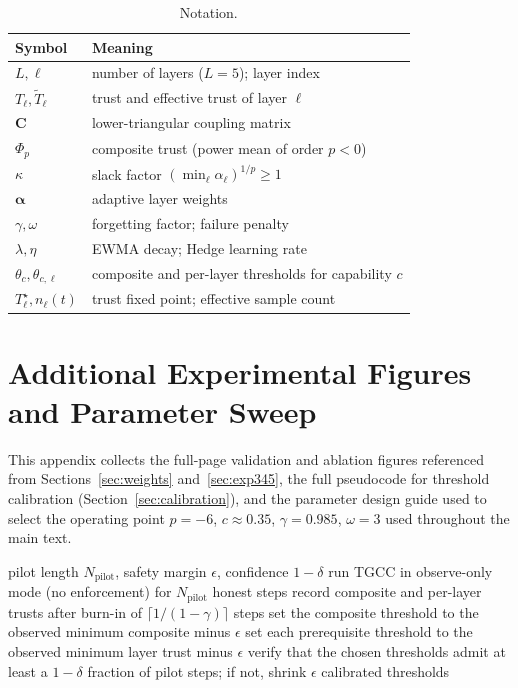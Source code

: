 \documentclass[sigconf,anonymous]{acmart}
\theoremstyle{plain}
\theoremstyle{definition}
\theoremstyle{remark}
\begin{document}
\begin{table}[h]
\caption{Notation.}
\label{tab:notation}
\centering\footnotesize\renewcommand{\arraystretch}{1.18}
\begin{tabular}{p{1.4cm} p{5.6cm}}
\toprule
\rowcolor{headrow}
{\color{white}\textbf{Symbol}} & {\color{white}\textbf{Meaning}} \\
\midrule
$L,\ell$ & number of layers ($L=5$); layer index \\
$T_\ell,\tilde T_\ell$ & trust and effective trust of layer $\ell$ \\
$\mathbf{C}$ & lower-triangular coupling matrix \\
$\Phi_p$ & composite trust (power mean of order $p<0$) \\
$\kappa$ & slack factor $(\min_\ell\alpha_\ell)^{1/p}\ge1$ \\
$\boldsymbol\alpha$ & adaptive layer weights \\
$\gamma,\omega$ & forgetting factor; failure penalty \\
$\lambda,\eta$ & EWMA decay; Hedge learning rate \\
$\theta_c,\theta_{c,\ell}$ & composite and per-layer thresholds for capability $c$ \\
$T_\ell^\star,n_\ell(t)$ & trust fixed point; effective sample count \\
\bottomrule
\end{tabular}
\end{table}

\section{Additional Experimental Figures and Parameter Sweep}
\label{app:figures}
This appendix collects the full-page validation and ablation figures referenced from
Sections~\ref{sec:weights} and~\ref{sec:exp345}, the full pseudocode for threshold
calibration (Section~\ref{sec:calibration}), and the parameter design guide used to
select the operating point $p=-6$, $c\approx0.35$, $\gamma=0.985$, $\omega=3$ used
throughout the main text.

\begin{algorithm}[h]
\caption{Threshold Calibration (pilot phase)}
\label{alg:calib}
\begin{algorithmic}[1]
\REQUIRE pilot length $N_{\mathrm{pilot}}$, safety margin $\epsilon$, confidence $1-\delta$
\STATE run TGCC in observe-only mode (no enforcement) for $N_{\mathrm{pilot}}$ honest steps
\STATE record composite and per-layer trusts after burn-in of $\lceil1/(1-\gamma)\rceil$ steps
\STATE set the composite threshold to the observed minimum composite minus $\epsilon$
\STATE set each prerequisite threshold to the observed minimum layer trust minus $\epsilon$
\STATE verify that the chosen thresholds admit at least a $1-\delta$ fraction of pilot steps; if not, shrink $\epsilon$
\RETURN calibrated thresholds
\end{algorithmic}
\end{algorithm}
\end{document}
